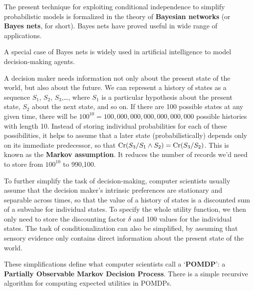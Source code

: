 The present technique for exploiting conditional independence to simplify
probabilistic models is formalized in the theory of \textbf{Bayesian networks}
(or \textbf{Bayes nets}, for short). Bayes nets have proved useful in wide range
of applications.

A special case of Bayes nets%
is widely used in artificial intelligence to model decision-making agents.

A decision maker needs information not only about the present state of the
world, but also about the future. We can represent a history of states as a
sequence $S_1$, $S_2$, $S_3$,\ldots, where $S_1$ is a particular hypothesis about
the present state, $S_2$ about the next state, and so on. If there are 100
possible states at any given time, there will be
$100^{10} = 100,000,000,000,000,000,000$ possible histories with length 10.
Instead of storing individual probabilities for each of these possibilities, it
helps to assume that a later state (probabilistically) depends only on its
immediate predecessor, so that $\text{Cr}(S_3/S_1 \land S_2) = \text{Cr}(S_3/S_2)$. This is
known as the \textbf{Markov assumption}. It reduces the number of records we'd
need to store from $100^{10}$ to 990,100.%

To further simplify the task of decision-making, computer scientists usually
assume that the decision maker's intrinsic preferences are stationary and
separable across times, so that the value of a history of states is a discounted
sum of a subvalue for individual states. To specify the whole utility
function, we then only need to store the discounting factor $\delta$ and 100
values for the individual states. The task of conditionalization can also be
simplified, by assuming that sensory evidence only contains direct information
about the present state of the world.

These simplifications define what computer scientists call a `\textbf{POMDP}': a
\textbf{Partially Observable Markov Decision Process}. There is a simple
recursive algorithm for computing expected utilities in POMDPs.


